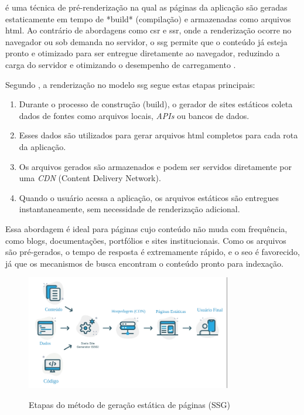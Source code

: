  é uma técnica de pré-renderização na qual as páginas da aplicação são geradas estaticamente em tempo de *build* (compilação) e armazenadas como arquivos \acrshort{html}. Ao contrário de abordagens como \acrshort{csr} e \acrshort{ssr}, onde a renderização ocorre no navegador ou sob demanda no servidor, o \acrshort{ssg} permite que o conteúdo já esteja pronto e otimizado para ser entregue diretamente ao navegador, reduzindo a carga do servidor e otimizando o desempenho de carregamento \cite{pahan2021}.

Segundo , a renderização no modelo \acrshort{ssg} segue estas etapas principais:

\begin{enumerate}
    \item Durante o processo de construção (build), o gerador de sites estáticos coleta dados de fontes como arquivos locais, \emph{APIs} ou bancos de dados.
    \item Esses dados são utilizados para gerar arquivos \acrshort{html} completos para cada rota da aplicação.
    \item Os arquivos gerados são armazenados e podem ser servidos diretamente por uma \emph{CDN} (Content Delivery Network).
    \item Quando o usuário acessa a aplicação, os arquivos estáticos são entregues instantaneamente, sem necessidade de renderização adicional.
\end{enumerate}

Essa abordagem é ideal para páginas cujo conteúdo não muda com frequência, como blogs, documentações, portfólios e sites institucionais. Como os arquivos são pré-gerados, o tempo de resposta é extremamente rápido, e o \acrshort{seo} é favorecido, já que os mecanismos de busca encontram o conteúdo pronto para indexação.

\begin{figure}[H]
  \centering
  \caption{Etapas do método de geração estática de páginas (SSG)}
  \includegraphics[width=0.8\textwidth]{media/static_site_generation.png}
  \label{fig:ssg}
\end{figure}

